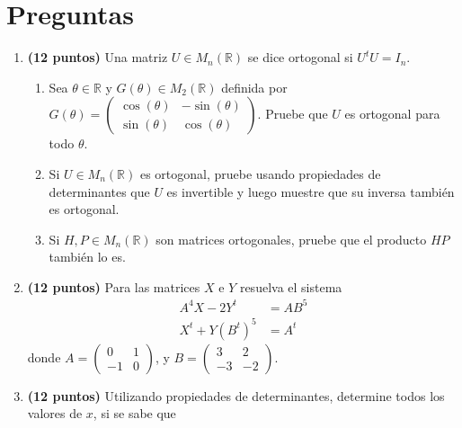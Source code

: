 \documentclass[a4paper]{article}
\begin{document}
\section*{Preguntas}
\begin{enumerate}


\item {\bf (12 puntos)} Una matriz $U\in M_n(\mathbb{R})$ se dice ortogonal si $U^tU=I_n$.
\begin{enumerate}
    \item Sea $\theta\in \mathbb{R}$ y $G(\theta)\in M_2(\mathbb{R})$ definida por $G(\theta)=\begin{pmatrix} \cos(\theta) & -\sin(\theta)\\ \sin(\theta) & \cos(\theta) \end{pmatrix}$. Pruebe que $U$ es ortogonal para todo $\theta$.
    \item Si $U\in M_n(\mathbb{R})$ es ortogonal, pruebe usando propiedades de determinantes que $U$ es invertible y luego muestre que su inversa tambi\'en es or\-to\-go\-nal.
    \item Si $H, P\in M_n(\mathbb{R})$ son matrices ortogonales, pruebe que el producto $HP$ tambi\'en lo es.
\end{enumerate}
\newpage

\newpage
\item {\bf (12 puntos)} Para las matrices $X$ e $Y$ resuelva el sistema
\begin{align*}
    A^4X-2Y^t&=AB^5\\
    X^t+Y(B^t)^5&=A^t
\end{align*}
donde $A=\begin{pmatrix}0 & 1 \\ -1 & 0 \end{pmatrix}$, y $B=\begin{pmatrix} 3 & 2 \\ -3 & -2 \end{pmatrix}$.
    
\newpage
\newpage
    

\item {\bf (12 puntos)} Utilizando propiedades de determinantes, determine todos los valores de $x$, si se sabe que 


\end{enumerate}
\end{document}
